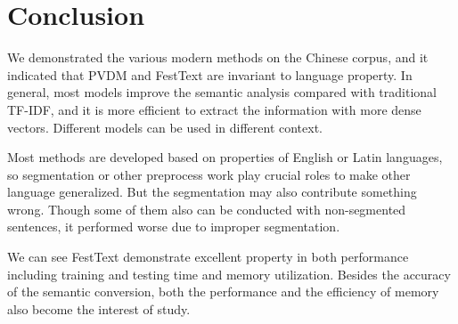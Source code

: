 \section{Conclusion}

We demonstrated the various modern methods on the Chinese corpus, and it indicated that PVDM and FestText are invariant to language property. 
In general, most models improve the semantic analysis compared with traditional TF-IDF, and it is more efficient to extract the information with more dense vectors.
Different models can be used in different context.

Most methods are developed based on properties of English or Latin languages, so segmentation or other preprocess work play crucial roles to make other language generalized.
But the segmentation may also contribute something wrong. Though some of them also can be conducted with non-segmented sentences, it performed worse due to improper segmentation.

We can see FestText demonstrate excellent property in both performance including training and testing time and memory utilization. 
Besides the accuracy of the semantic conversion, both the performance and the efficiency of memory also become the interest of study.


